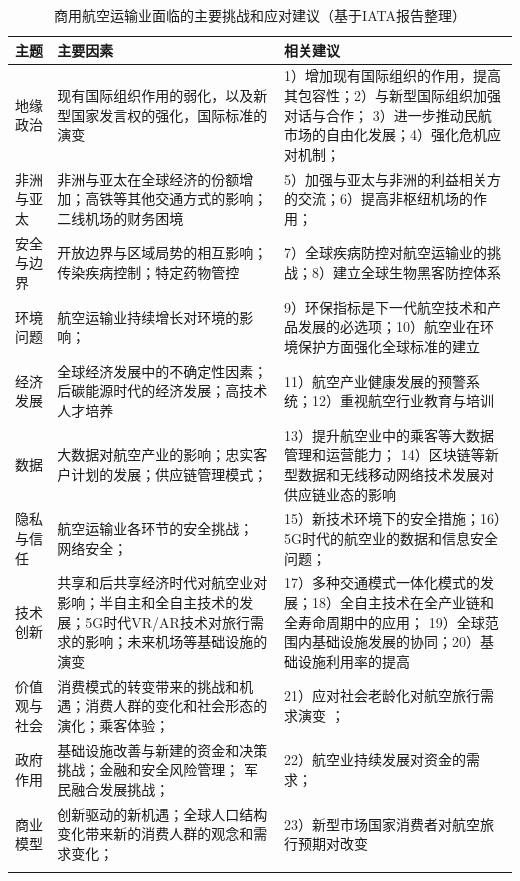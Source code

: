 \documentclass[12pt,a4paper]{report}
\begin{document}
\begin{table}[h]
\caption{商用航空运输业面临的主要挑战和应对建议（基于IATA报告整理\cite{iata2035}）}
\label{table:iatatable}
\small
\begin{tabular}{|p{2.5cm}|p{5.5cm}|p{5.5cm}|}
\hhline{|===|}
主题 & 主要因素 & 相关建议  \\ \hline
地缘政治 & 现有国际组织作用的弱化，以及新型国家发言权的强化，国际标准的演变 &   1）增加现有国际组织的作用，提高其包容性；2）与新型国际组织加强对话与合作； 3）进一步推动民航市场的自由化发展；4）强化危机应对机制；\\ \hline
非洲与亚太 & 非洲与亚太在全球经济的份额增加；高铁等其他交通方式的影响；二线机场的财务困境  & 5）加强与亚太与非洲的利益相关方的交流；6）提高非枢纽机场的作用；\\ \hline
安全与边界& 开放边界与区域局势的相互影响；传染疾病控制；特定药物管控 &  7）全球疾病防控对航空运输业的挑战；8）建立全球生物黑客防控体系 \\ \hline
环境问题  & 航空运输业持续增长对环境的影响； &  9）环保指标是下一代航空技术和产品发展的必选项；10）航空业在环境保护方面强化全球标准的建立 \\ \hline
经济发展  & 全球经济发展中的不确定性因素；后碳能源时代的经济发展；高技术人才培养 & 11）航空产业健康发展的预警系统；12）重视航空行业教育与培训  \\ \hline
数据 &  大数据对航空产业的影响；忠实客户计划的发展；供应链管理模式；& 13）提升航空业中的乘客等大数据管理和运营能力； 14）区块链等新型数据和无线移动网络技术发展对供应链业态的影响\\ \hline 
隐私与信任  & 航空运输业各环节的安全挑战； 网络安全；&  15）新技术环境下的安全措施；16）5G时代的航空业的数据和信息安全问题；\\ \hline
技术创新 & 共享和后共享经济时代对航空业对影响；半自主和全自主技术的发展；5G时代VR/AR技术对旅行需求的影响；未来机场等基础设施的演变 & 17）多种交通模式一体化模式的发展；18）全自主技术在全产业链和全寿命周期中的应用； 19）全球范围内基础设施发展的协同；20）基础设施利用率的提高\\ \hline
价值观与社会 & 消费模式的转变带来的挑战和机遇；消费人群的变化和社会形态的演化；乘客体验； & 21）应对社会老龄化对航空旅行需求演变 ； \\ \hline 
政府作用 & 基础设施改善与新建的资金和决策挑战；金融和安全风险管理； 军民融合发展挑战； &  22）航空业持续发展对资金的需求；\\ \hline
商业模型 & 创新驱动的新机遇；全球人口结构变化带来新的消费人群的观念和需求变化； &  23）新型市场国家消费者对航空旅行预期对改变\\ 
\hhline{|===|}
\end{tabular}
\end{table}
\end{document}
